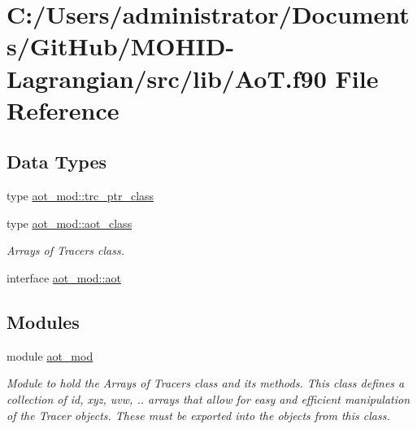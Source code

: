 \hypertarget{_ao_t_8f90}{}\section{C\+:/\+Users/administrator/\+Documents/\+Git\+Hub/\+M\+O\+H\+I\+D-\/\+Lagrangian/src/lib/\+AoT.f90 File Reference}
\label{_ao_t_8f90}
\subsection*{Data Types}
\begin{DoxyCompactItemize}
\item 
type \mbox{\hyperlink{structaot__mod_1_1trc__ptr__class}{aot\+\_\+mod\+::trc\+\_\+ptr\+\_\+class}}
\item 
type \mbox{\hyperlink{structaot__mod_1_1aot__class}{aot\+\_\+mod\+::aot\+\_\+class}}
\begin{DoxyCompactList}\small\item\em Arrays of Tracers class. \end{DoxyCompactList}\item 
interface \mbox{\hyperlink{interfaceaot__mod_1_1aot}{aot\+\_\+mod\+::aot}}
\end{DoxyCompactItemize}
\subsection*{Modules}
\begin{DoxyCompactItemize}
\item 
module \mbox{\hyperlink{namespaceaot__mod}{aot\+\_\+mod}}
\begin{DoxyCompactList}\small\item\em Module to hold the Arrays of Tracers class and its methods. This class defines a collection of id, xyz, uvw, .. arrays that allow for easy and efficient manipulation of the Tracer objects. These must be exported into the objects from this class. \end{DoxyCompactList}\end{DoxyCompactItemize}
